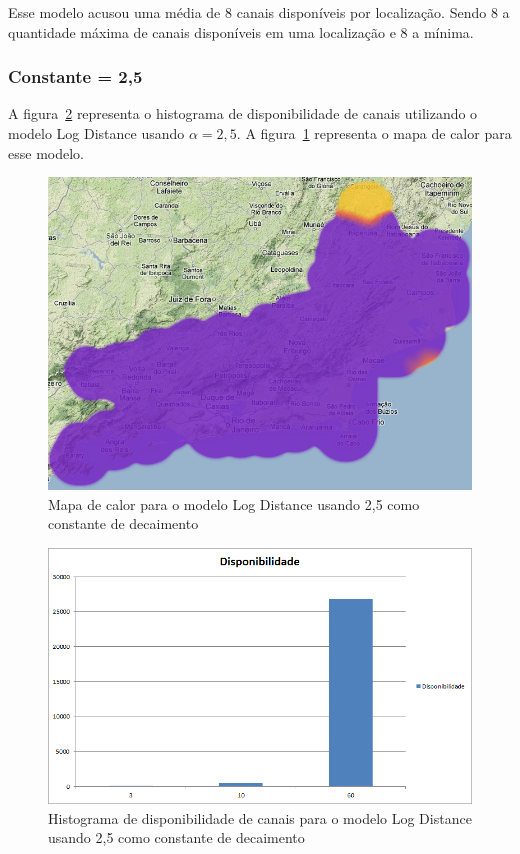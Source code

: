 Esse modelo acusou uma média de 8 canais disponíveis por localização. Sendo 8 a quantidade máxima de canais disponíveis em uma localização e 8 a mínima.

\subsubsection{Constante = 2,5}

A figura~\ref{fig:histogramalogdist25} representa o histograma de disponibilidade de canais utilizando o modelo Log Distance usando \begin{math}\alpha=2,5 \end{math}. A figura~\ref{fig:LogDist25heatmap} representa o mapa de calor para esse modelo.

\begin{figure}[htb]
\centering
\includegraphics[width=1.0\textwidth]{figs/logdist25heatmap}
\caption[Mapa de calor para o modelo Log Distance usando 2,5 como constante de decaimento]
{Mapa de calor para o modelo Log Distance usando 2,5 como constante de decaimento}
\label{fig:LogDist25heatmap}
\end{figure} 

\begin{figure}[htb]
\centering
\includegraphics[width=1.0\textwidth]{figs/histogramalogdist25}
\caption[Histograma de disponibilidade de canais para o modelo Log Distance usando 2,5 como constante de decaimento]
{Histograma de disponibilidade de canais para o modelo Log Distance usando 2,5 como constante de decaimento}
\label{fig:histogramalogdist25}
\end{figure} 

